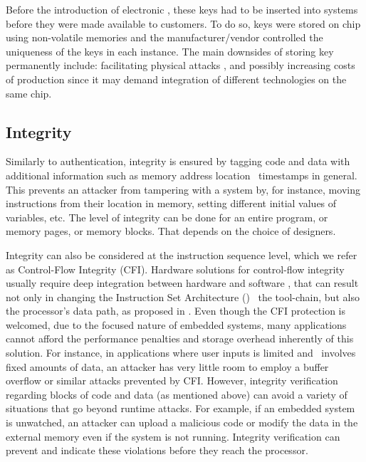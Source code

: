 Before the introduction of electronic \pufs \cite{Gassend2002:PUFs}, these keys had to be inserted into systems before they were made available to customers. To do so, keys were stored on chip using non-volatile memories and the manufacturer\slash{}vendor controlled the uniqueness of the keys in each instance. The main downsides of storing key permanently include: facilitating physical attacks \cite{Sadeghi2010:Security-PUFs}, and possibly increasing costs of production since it may demand integration of different technologies on the same chip.



\subsection{Integrity}
\label{subsec:Integrity}

Similarly to authentication, integrity is ensured by tagging code and data with additional information such as memory address location \andor~timestamps in general. This prevents an attacker from tampering with a system by, for instance, moving instructions from their location in memory, setting different initial values of variables, etc. The level of integrity can be done for an entire program, or memory pages, or memory blocks. That depends on the choice of designers.

Integrity can also be considered at the instruction sequence level, which we refer as Control-Flow Integrity (CFI). Hardware solutions for control-flow integrity usually require deep integration between hardware and software \cite{Davi2015:HAFIX}, that can result not only in changing the Instruction Set Architecture (\isa) \andor~the tool-chain, but also the processor's data path, as proposed in \cite{Gelbart2005:CODESSEAL, Kanuparthi2012:DynamicIntegrity}. Even though the CFI protection is welcomed, due to the focused nature of embedded systems, many applications cannot afford the performance penalties and storage overhead inherently of this solution. For instance, in applications where user inputs is limited and \io~involves fixed amounts of data, an attacker has very little room to employ a buffer overflow or similar attacks prevented by CFI. However, integrity verification regarding blocks of code and data (as mentioned above) can avoid a variety of situations that go beyond runtime attacks. For example, if an embedded system is unwatched, an attacker can upload a malicious code or modify the data in the external memory even if the system is not running. Integrity verification can prevent and indicate these violations before they reach the processor.

